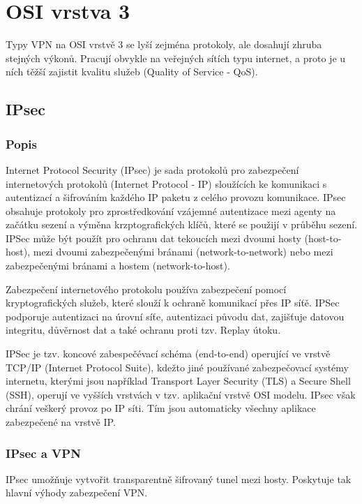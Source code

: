 \documentclass[thesis=B,czech]{FITthesis}[2012/06/26]
\begin{document}
  \section{OSI vrstva 3}

    Typy VPN na OSI vrstvě 3 se lyší zejména protokoly, ale dosahují zhruba stejných výkonů. Pracují obvykle na veřejných sítích typu internet, a proto je u ních těžší zajistit kvalitu služeb (Quality of Service - QoS).

    \subsection{IPsec}

      \subsubsection{Popis}
        Internet Protocol Security (IPsec) je sada protokolů pro zabezpečení internetových protokolů (Internet Protocol - IP) sloužících ke komunikaci s autentizací a šifrováním každého IP paketu z celého provozu komunikace. IPsec obsahuje protokoly pro zprostředkování vzájemné autentizace mezi agenty na začátku sezení a výměna krzptografických klíčů, které se použijí v průběhu sezení. IPSec může být použít pro ochranu dat tekoucích mezi dvoumi hosty (host-to-host), mezi dvoumi zabezpečenými bránami (network-to-network) nebo mezi zabezpečenými bránami a hostem (network-to-host).

        Zabezpečení internetového protokolu používa zabezpečení pomocí kryptografických služeb, které slouží k ochraně komunikací přes IP síťě. IPSec podporuje autentizaci na úrovní síťe, autentizaci původu dat, zajišťuje datovou integritu, důvěrnost dat a také ochranu proti tzv. Replay útoku.

        IPSec je tzv. koncové zabespečévací schéma (end-to-end) operující ve vrstvě TCP/IP (Internet Protocol Suite), kdežto jiné používané zabezpečovací systémy internetu, kterými jsou například Transport Layer Security (TLS) a Secure Shell (SSH), operují ve vyšších vrstvách v tzv. aplikační vrstvě OSI modelu. IPsec však chrání veškerý provoz po IP síti. Tím jsou automaticky všechny aplikace zabezpečené na vrstvě IP.
        \cite{ipsec_basics}

      \subsubsection{IPsec a VPN}

        IPsec umožňuje vytvořit transparentně šifrovaný tunel mezi hosty. Poskytuje tak hlavní výhody zabezpečení VPN. \cite{ipsec_vpn}
\end{document}
